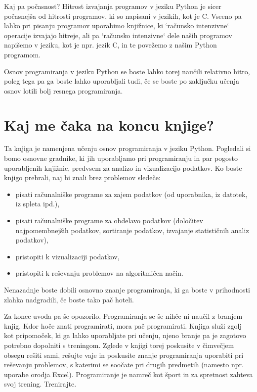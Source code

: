 Kaj pa počasnost? Hitrost izvajanja programov v jeziku Python je sicer počasnejša od hitrosti programov, ki so napisani v jezikih, kot je C. Vseeno pa lahko pri pisanju programov uporabimo knjižnice, ki `računsko intenzivne` operacije izvajajo hitreje, ali pa `računsko intenzivne` dele naših programov napišemo v jeziku, kot je npr. jezik C, in te povežemo z našim Python programom.

Osnov programiranja v jeziku Python se boste lahko torej naučili relativno hitro, poleg tega pa ga boste lahko uporabljali tudi, če se boste po zaključku učenja osnov lotili bolj resnega programiranja. 

\section{Kaj me čaka na koncu knjige?} 

Ta knjiga je namenjena učenju osnov programiranja v jeziku Python. Pogledali si bomo osnovne gradnike, ki jih uporabljamo pri programiranju in par pogosto uporabljenih knjižnic, predvsem za analizo in vizualizacijo podatkov. Ko boste knjigo prebrali, naj bi znali brez problemov sledeče:
\begin{itemize}
    \item pisati računalniške programe za zajem podatkov (od uporabnika, iz datotek, iz spleta ipd.),
    \item pisati računalniške programe za obdelavo podatkov (določitev najpomembnejših podatkov, sortiranje podatkov, izvajanje statističnih analiz podatkov),
    \item pristopiti k vizualizaciji podatkov,
    \item pristopiti k reševanju problemov na algoritmičen način.
\end{itemize}
Nenazadnje boste dobili osnovno znanje programiranja, ki ga boste v prihodnosti zlahka nadgradili, če boste tako pač hoteli.

Za konec uvoda pa še opozorilo. Programiranja se še nihče ni naučil z branjem knjig. Kdor hoče znati programirati, mora pač programirati. Knjiga služi zgolj kot pripomoček, ki ga lahko uporabljate pri učenju, njeno branje pa je zagotovo potrebno dopolniti s treningom. Zglede v knjigi torej poskusite v čimvečjem obsegu rešiti sami, rešujte vaje in poskusite znanje programiranja uporabiti pri reševanju problemov, s katerimi se soočate pri drugih predmetih (namesto npr. uporabe orodja Excel). Programiranje je namreč kot šport in za spretnost zahteva svoj trening. Trenirajte.


